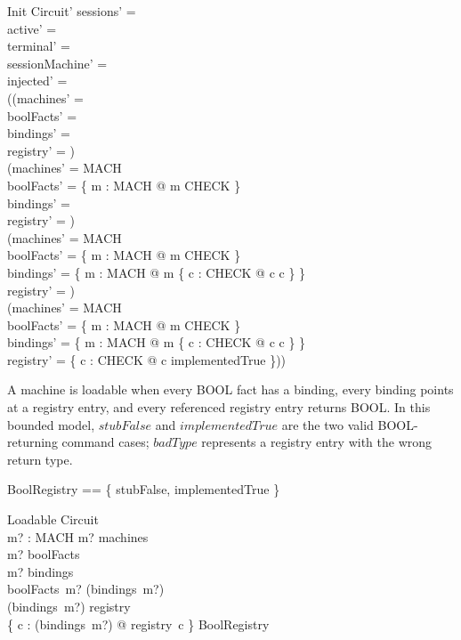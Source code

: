 \documentclass[a4paper,10pt,fleqn]{article}
\begin{document}
\begin{schema}{Init}
  Circuit'
\where
  sessions' = \emptyset \\
  active' = \emptyset \\
  terminal' = \emptyset \\
  sessionMachine' = \emptyset \\
  injected' = \emptyset \\
  ((machines' = \emptyset \\
    \land boolFacts' = \emptyset \\
    \land bindings' = \emptyset \\
    \land registry' = \emptyset) \\
  \lor (machines' = MACH \\
    \land boolFacts' = \{ m : MACH @ m \mapsto CHECK \} \\
    \land bindings' = \emptyset \\
    \land registry' = \emptyset) \\
  \lor (machines' = MACH \\
    \land boolFacts' = \{ m : MACH @ m \mapsto CHECK \} \\
    \land bindings' = \{ m : MACH @ m \mapsto \{ c : CHECK @ c \mapsto c \} \} \\
    \land registry' = \emptyset) \\
  \lor (machines' = MACH \\
    \land boolFacts' = \{ m : MACH @ m \mapsto CHECK \} \\
    \land bindings' = \{ m : MACH @ m \mapsto \{ c : CHECK @ c \mapsto c \} \} \\
    \land registry' = \{ c : CHECK @ c \mapsto implementedTrue \}))
\end{schema}

A machine is loadable when every BOOL fact has a binding, every binding points
at a registry entry, and every referenced registry entry returns BOOL. In this
bounded model, $stubFalse$ and $implementedTrue$ are the two valid BOOL-returning
command cases; $badType$ represents a registry entry with the wrong return type.

\begin{zed}
  BoolRegistry == \{ stubFalse, implementedTrue \}
\end{zed}

\begin{schema}{Loadable}
  Circuit \\
  m? : MACH
\where
  m? \in machines \\
  m? \in \dom boolFacts \\
  m? \in \dom bindings \\
  boolFacts~m? \subseteq \dom (bindings~m?) \\
  \ran (bindings~m?) \subseteq \dom registry \\
  \{ c : \ran (bindings~m?) @ registry~c \} \subseteq BoolRegistry
\end{schema}
\end{document}
